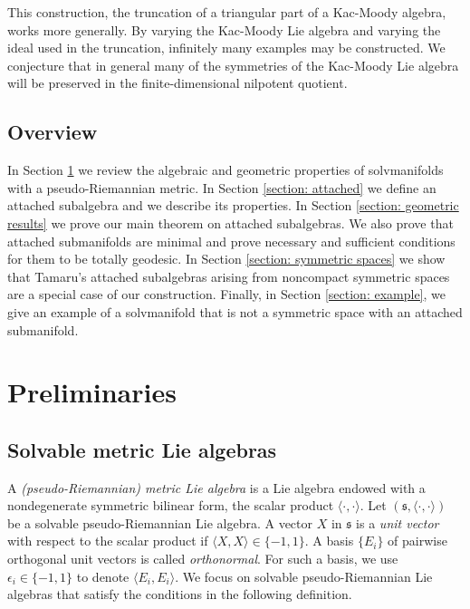 \documentclass[12pt]{amsart}
\newcommand{\la}{\langle}
\newcommand{\ra}{\rangle}
\newcommand{\fraks}{\ensuremath{\mathfrak{s}} }
\newcommand\ip{{\langle\cdot {,} \cdot\rangle}}
\theoremstyle{plain}
\theoremstyle{definition}
\theoremstyle{remark}
\numberwithin{equation}{section}
\numberwithin{theorem}{section}
\begin{document}
This   construction, the truncation of a  triangular part of a 
 Kac-Moody algebra,  works  more generally.  By varying the Kac-Moody Lie algebra and varying the ideal used in the truncation, infinitely many examples may be constructed.  We conjecture that in general many of the symmetries of the Kac-Moody Lie algebra will be preserved in the finite-dimensional nilpotent quotient.

\subsection{Overview}   In Section \ref{section: preliminaries} we review the algebraic and geometric properties of  solvmanifolds with a pseudo-Riemannian metric. In Section \ref{section: attached} we define an attached subalgebra 
and we describe its properties. In Section \ref{section: geometric results} we prove our main theorem 
on attached subalgebras. We also prove that attached submanifolds are minimal and prove necessary and sufficient conditions for them to be  totally geodesic. In Section \ref{section: symmetric spaces} we show that Tamaru's attached subalgebras arising from noncompact symmetric spaces are a special case of our construction. Finally, in Section \ref{section: example}, we give an example of a solvmanifold that is not a symmetric space with an attached submanifold.

\section{Preliminaries}\label{section: preliminaries}

\subsection{Solvable metric Lie algebras}\label{sec: solvable}
A {\em (pseudo-Riemannian) metric Lie algebra} is a Lie algebra
endowed with a nondegenerate
symmetric bilinear form, the scalar product $\ip$.
Let $(\fraks,\ip)$ be a solvable pseudo-Riemannian Lie algebra.
A vector $X$ in $\fraks$ is a {\em unit vector} with respect to the
scalar product  if  $\la X,X\ra  \in \{-1,1\}$.
A basis $\{E_i\}$ of pairwise orthogonal  unit vectors is called {\em
  orthonormal}.
For such a basis, we use   $\epsilon_i \in \{-1,1\}$ to denote $\la E_i, E_i \ra$.
We focus on solvable pseudo-Riemannian  Lie algebras that  satisfy the conditions in the following definition.  
\end{document}
